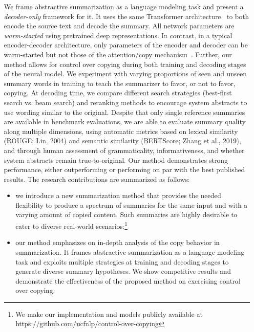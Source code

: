 \documentclass[letterpaper]{article} %
\begin{document}
We frame abstractive summarization as a language modeling task and present a \emph{decoder-only} framework for it.
It uses the same Transformer architecture~\cite{Vaswani:2017} to both encode the source text and decode the summary.
All network parameters are \emph{warm-started} using pretrained deep representations.
In contrast, in a typical encoder-decoder architecture, only parameters of the encoder and decoder can be warm-started but not those of the attention/copy mechanism~\cite{Khandelwal:2019}.
Further, our method allows for control over copying during both training and decoding stages of the neural model.
We experiment with varying proportions of seen and unseen summary words in training to teach the summarizer to favor, or not to favor, copying.
At decoding time, we compare different search strategies (best-first search vs. beam search) and reranking methods to encourage system abstracts to use wording similar to the original.
Despite that only single reference summaries are available in benchmark evaluations, we are able to evaluate summary quality along multiple dimensions, using automatic metrics based on lexical similarity (ROUGE; Lin, 2004)\nocite{Lin:2004} and semantic similarity (BERTScore; Zhang et al., 2019)\nocite{Zhang:2019:BERTScore}, and through human assessment of grammaticality, informativeness, and whether system abstracts remain true-to-original.
Our method demonstrates strong performance, either outperforming or performing on par with the best published results.
The research contributions are summarized as follows:
\begin{itemize}[topsep=5pt,itemsep=0pt,leftmargin=*]

\item we introduce a new summarization method that provides the needed flexibility to produce a spectrum of summaries for the same input and with a varying amount of copied content. 
Such summaries are highly desirable to cater to diverse real-world scenarios;\footnote{We make our implementation and models publicly available at\\ https://github.com/ucfnlp/control-over-copying}

\item our method emphasizes on in-depth analysis of the copy behavior in summarization. 
It frames abstractive summarization as a language modeling task and exploits multiple strategies at training and decoding stages to generate diverse summary hypotheses. 
We show competitive results and demonstrate the effectiveness of the proposed method on exercising control over copying. 

\end{itemize}
\end{document}
